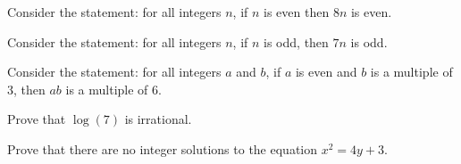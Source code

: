 \documentclass[11pt]{exam}
\begin{document}
\begin{questions}
\question Consider the statement: for all integers $n$, if $n$ is even then $8n$ is even.

\question Consider the statement: for all integers $n$, if $n$ is odd, then $7n$ is odd.

\question Consider the statement: for all integers $a$ and $b$, if $a$ is even and $b$ is a multiple of 3, then $ab$ is a multiple of 6.


\question Prove that $\log(7)$ is irrational.


\question Prove that there are no integer solutions to the equation $x^2 = 4y + 3$.




\end{questions}
\end{document}
